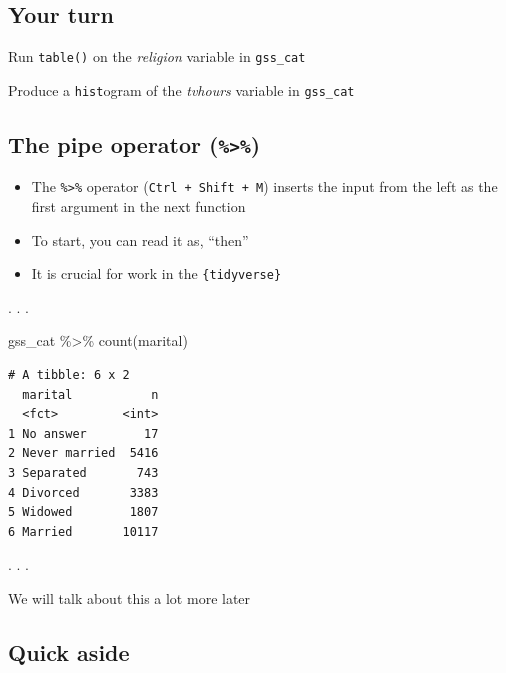 \documentclass[
  letterpaper,
  DIV=11,
  numbers=noendperiod,
  oneside]{scrartcl}
\newenvironment{Shaded}{\begin{snugshade}}{\end{snugshade}}
\newcommand{\FunctionTok}[1]{\textcolor[rgb]{0.28,0.35,0.67}{#1}}
\newcommand{\NormalTok}[1]{\textcolor[rgb]{0.00,0.23,0.31}{#1}}
\newcommand{\SpecialCharTok}[1]{\textcolor[rgb]{0.37,0.37,0.37}{#1}}
\providecommand{\tightlist}{%
  \setlength{\itemsep}{0pt}\setlength{\parskip}{0pt}}\usepackage{longtable,booktabs,array}
\begin{document}
\hypertarget{your-turn}{%
\subsection{Your turn}\label{your-turn}}

Run \texttt{table()} on the \emph{religion} variable in
\texttt{gss\_cat}

Produce a \texttt{hist}ogram of the \emph{tvhours} variable in
\texttt{gss\_cat}

\hypertarget{the-pipe-operator}{%
\subsection{\texorpdfstring{The pipe operator
(\texttt{\%\textgreater{}\%})}{The pipe operator (\%\textgreater\%)}}\label{the-pipe-operator}}

\begin{itemize}
\tightlist
\item
  The \texttt{\%\textgreater{}\%} operator
  (\texttt{Ctrl\ +\ Shift\ +\ M}) inserts the input from the left as the
  first argument in the next function
\item
  To start, you can read it as, ``then''
\item
  It is crucial for work in the \texttt{\{tidyverse\}}
\end{itemize}

. . .

\begin{Shaded}
\begin{Highlighting}[]
\NormalTok{gss\_cat }\SpecialCharTok{\%\textgreater{}\%} 
  \FunctionTok{count}\NormalTok{(marital)}
\end{Highlighting}
\end{Shaded}

\begin{verbatim}
# A tibble: 6 x 2
  marital           n
  <fct>         <int>
1 No answer        17
2 Never married  5416
3 Separated       743
4 Divorced       3383
5 Widowed        1807
6 Married       10117
\end{verbatim}

. . .

We will talk about this a lot more later

\hypertarget{quick-aside}{%
\subsection{Quick aside}\label{quick-aside}}
\end{document}
